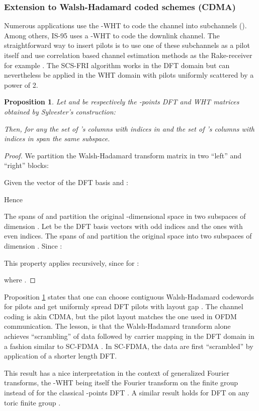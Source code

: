 \documentclass[journal,10pt]{IEEEtran}
\newtheorem{proposition}{Proposition}
\begin{document}
\subsubsection{Extension to Walsh-Hadamard coded schemes (CDMA)}
Numerous applications use the -WHT to code the channel into  subchannels (). Among others, IS-95 uses a -WHT to code the downlink channel. The straightforward way to insert pilots is to use one of these subchannels as a pilot itself and use correlation based channel estimation methods as the Rake-receiver for example  \cite{Price1958}. The SCS-FRI algorithm works in the DFT domain but can nevertheless be applied in the WHT domain with pilots uniformly scattered by  a power of 2.
\begin{proposition}\label{prop:WHT}
Let  and  be respectively the -points DFT and WHT matrices obtained by Sylvester's construction:

Then, for any  the set of 's columns  with indices in   and the set of 's columns with indices in  span the same subspace.
\end{proposition}
\begin{proof}
We partition the Walsh-Hadamard transform matrix in two ``left'' and ``right'' blocks:

Given  the  vector of the DFT basis and :

Hence

The spans of  and  partition the original -dimensional space in two subspaces of  dimension . Let  be the DFT basis vectors with odd indices and  the ones with even indices. The spans of  and  partition the original space into two subspaces of dimension . Since :

This property applies recursively, since for :

where .
\end{proof}
Proposition \ref{prop:WHT} states that one can choose  contiguous Walsh-Hadamard codewords for pilots and get  uniformly spread DFT pilots with layout gap . The channel coding is akin CDMA, but the pilot layout matches the one used in OFDM communication. The lesson, is that the Walsh-Hadamard transform alone achieves ``scrambling'' of data followed by carrier mapping in the DFT domain in a fashion similar to SC-FDMA \cite{Myung2007}. In SC-FDMA, the data are first ``scrambled'' by application of a shorter length DFT.


This result  has a nice interpretation in the context of generalized Fourier transforms, the -WHT being itself the Fourier transform on the finite group  instead of  for the classical -points DFT \cite{Barbotin2010,Terras1999}. A similar result holds for DFT on any toric finite group \cite{Barbotin2010}.
 
\end{document}
